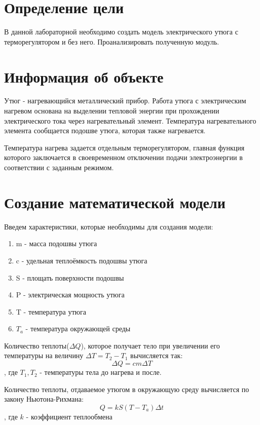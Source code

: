 \documentclass[a4paper, 14pt]{extarticle}
\begin{document}
	\pagebreak	

	\section{Определение цели}
		В данной лабораторной необходимо создать модель электрического утюга с терморегулятором и без него.
		Проанализировать полученную модуль.

	\section{Информация об объекте}
		Утюг - нагревающийся металлический прибор. Работа утюга с электрическим нагревом основана на выделении тепловой энергии при прохождении электрического тока через нагревательный элемент. Температура нагревательного элемента сообщается подошве утюга, которая также нагревается.
		
		Температура нагрева задается отдельным терморегулятором, главная функция которого заключается в своевременном отключении подачи электроэнергии в соответствии с заданным режимом.

	\section{Создание математической модели}
		Введем характеристики, которые необходимы для создания модели:
		\begin{enumerate}[leftmargin=3\parindent, itemsep=0mm]
			\item m - масса подошвы утюга
			\item c - удельная теплоёмкость подошвы утюга
			\item S - площать поверхности подошвы
			\item P - электрическая мощность утюга
			\item T - температура утюга
			\item $T_a$ - температура окружающей среды
		\end{enumerate}
	
		Количество теплоты(\(\Delta Q\)), которое получает тело при увеличении его температуры на величину 
		\( \Delta T = T_2 - T_1 \) вычисляется так:
		\[ \Delta Q = cm \Delta T \], где \( T_1, T_2\) - температуры тела до нагрева и после.
		
		Количество теплоты, отдаваемое утюгом в окружающую среду вычисляется по закону Ньютона-Рихмана:
		\[ Q = kS(T-T_a) \Delta t \]
		, где \(k\) - коэффициент теплообмена
			
\end{document}

